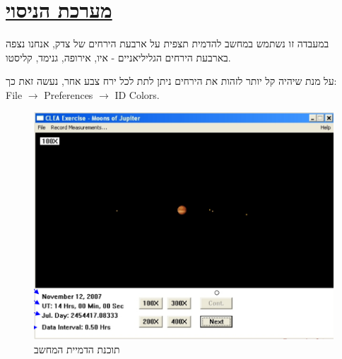 \documentclass[a4paper, 12pt]{article}
\begin{document}
    \vfill


    \pagebreak %

    \section{\underline{מערכת הניסוי}}
    \begin{flushright}
        במעבדה זו נשתמש במחשב להדמית תצפית על ארבעת הירחים של צדק,
        אנחנו נצפה בארבעת הירחים הגליליאניים - איו, אירופה, גנימד, קליסטו.

        על מנת שיהיה קל יותר לזהות את הירחים ניתן לתת לכל ירח צבע אחר, נעשה זאת כך:\\
        \textenglish{File $\rightarrow$ Preferences $\rightarrow$ ID Colors}.
    \end{flushright}

    \vspace{40pt}

    \begin{figure}[h!]
        \centering
        \includegraphics[width=\textwidth]{../assets/software_image.png}
        \caption{תוכנת הדמיית המחשב}
    \end{figure}

    \pagebreak %
\end{document}
